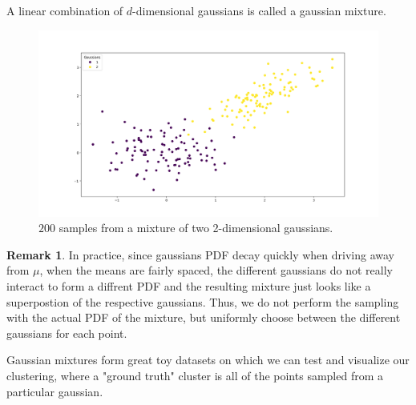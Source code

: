 \documentclass[a4paper,12pt]{article}
\theoremstyle{definition}
\newtheorem*{rem}{Remark}
\theoremstyle{plain}
\begin{document}
A linear combination of $d$-dimensional gaussians is called a gaussian mixture.
\begin{figure}[H]
	\centering
	\includegraphics[width=0.6\linewidth]{figures/2gm}
	\caption{$200$ samples from a mixture of two 2-dimensional gaussians.}
	\label{fig:2gm}
\end{figure}
\begin{rem} 
	In practice, since gaussians PDF decay quickly when driving away from $\mu$, when the means are fairly spaced, the different gaussians do not really interact to form a diffrent PDF and the resulting mixture just looks like a superpostion of the respective gaussians. Thus, we do not perform the sampling with the actual PDF of the mixture, but uniformly choose between the different gaussians for each point.
\end{rem}
Gaussian mixtures form great toy datasets on which we can test and visualize our clustering, where a "ground truth" cluster is all of the points sampled from a particular gaussian.
\end{document}
